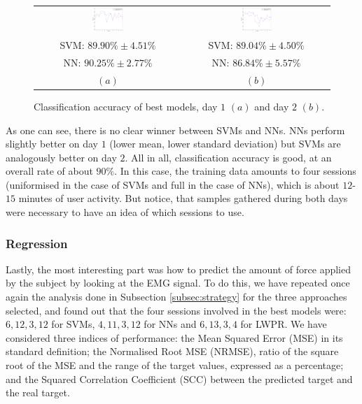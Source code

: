 \begin{figure}[!ht] \centering
  \begin{tabular}{cc}
    \includegraphics[width=0.22\textwidth]{figs/fig_class_resCrossBestOnDay1}
    &
    \includegraphics[width=0.22\textwidth]{figs/fig_class_resCrossBestOnDay2} \\
    SVM: $89.90\% \pm 4.51\%$ & SVM: $89.04\% \pm 4.50\%$ \\
    NN: $90.25\% \pm 2.77\%$ & NN: $86.84\% \pm 5.57\%$ \\
    $(a)$ & $(b)$ \\
  \end{tabular}
  \caption{Classification accuracy of best models, day $1$ $(a)$ and
    day $2$ $(b)$.}
  \label{fig:best_class}
\end{figure}

As one can see, there is no clear winner between SVMs and NNs. NNs
perform slightly better on day $1$ (lower mean, lower standard
deviation) but SVMs are analogously better on day $2$. All in all,
classification accuracy is good, at an overall rate of about
$90\%$. In this case, the training data amounts to four sessions
(uniformised in the case of SVMs and full in the case of NNs), which
is about $12$-$15$ minutes of user activity. But notice, that samples
gathered during both days were necessary to have an idea of which
sessions to use.

\subsubsection{Regression}

Lastly, the most interesting part was how to predict the amount of
force applied by the subject by looking at the EMG signal. To do this,
we have repeated once again the analysis done in Subsection
\ref{subsec:strategy} for the three approaches selected, and found out
that the four sessions involved in the best models were: $6,12,3,12$
for SVMs, $4,11,3,12$ for NNs and $6,13,3,4$ for LWPR. We have
considered three indices of performance: the Mean Squared Error (MSE)
in its standard definition; the Normalised Root MSE (NRMSE), ratio of
the square root of the MSE and the range of the target values,
expressed as a percentage; and the Squared Correlation Coefficient
(SCC) between the predicted target and the real target.

